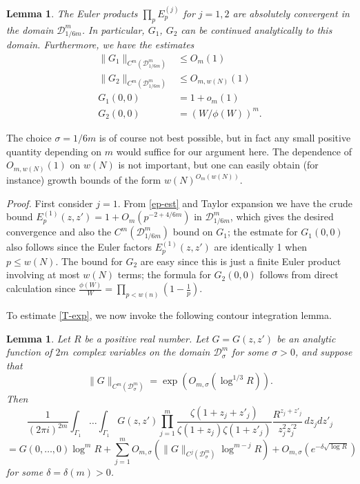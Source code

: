 \documentclass[12pt,a4paper,reqno]{amsart}
\numberwithin{equation}{section}
\theoremstyle{plain}
\newtheorem{lemma}[subsection]{Lemma}
\theoremstyle{definition}
\renewcommand{\leq}{\leqslant}
\def\D{{\mathcal D}}
\def\w{w}
\def\vs{\vspace{11pt}}
\def\ni{\noindent}
\def\proof{\noindent\textit{Proof. }}
\def\endproof{\hfill{\usebox{\proofbox}}}
\def\emph#1{{\it #1}}
\begin{document}
\begin{lemma}\label{midnight}  The Euler products $\prod_p E_p^{(j)}$ for $j=1,2$ are absolutely convergent in the domain
$\D^m_{1/6m}$.  In particular, $G_1$, $G_2$ can be continued analytically to this 
domain.  Furthermore, we have the estimates
\begin{align*}
\| G_1 \|_{C^m(\D^m_{1/6m})} &\leq O_m(1) \\
\| G_2 \|_{C^m(\D^m_{1/6m})} &\leq O_{m,\w(N)}(1) \\
G_1(0,0) &= 1 + o_m(1) \\
G_2(0,0) &= (W/\phi(W))^m.
\end{align*}
\end{lemma}

\ni\emph{Remark.} The choice $\sigma = 1/6m$ is of course not best possible, but in fact any small positive quantity depending on $m$ would suffice for our argument here.  The dependence of $O_{m,\w(N)}(1)$ on $\w(N)$ is not important, but one can easily obtain (for instance) growth bounds of the form $\w(N)^{O_m(\w(N))}$.\vs

\ni\proof First consider $j=1$.  From \eqref{ep-est} and Taylor expansion
 we have the crude bound $E_p^{(1)}(z,z') = 1 + O_m(p^{-2+4/6m})$ in $\D^m_{1/6m}$, which gives the desired
convergence and also the $C^m(\D^m_{1/6m})$ bound on $G_1$; the estmate for $G_1(0,0)$ also follows since
the Euler factors $E_p^{(1)}(z,z')$ are identically 1 when $p \leq \w(N)$.  The bound for $G_2$ are easy since
this is just a finite Euler product involving at most $\w(N)$ terms; the formula for $G_2(0,0)$ follows
from direct calculation since $\frac{\phi(W)}{W} = \prod_{p < \w(n)} (1 - \frac{1}{p})$.
\endproof \vs

\ni To estimate \eqref{T-exp}, we now invoke the following contour integration lemma.


\begin{lemma}\label{zeta-bound}\cite{goldston-yildirim}
Let $R$ be a positive real number. Let $G = G(z,z')$ be an analytic function of $2m$ complex variables on the domain $\D^m_\sigma$ for some $\sigma > 0$, and suppose that 
\begin{equation}\label{der-bound}\|G\|_{C^m(\D^m_\sigma)} = \exp(O_{m,\sigma}(\log^{1/3} R)).\end{equation}
 Then
\[ \frac{1}{(2\pi i)^{2m}}\int_{\Gamma_1} \dots \int_{\Gamma_1} G(z,z')\prod_{j=1}^m \frac{\zeta(1+z_j + z'_j)}{\zeta(1 + z_j)\zeta(1 + z'_j)} \frac{R^{z_j + z'_j}}{z_j^2z^{\prime 2}_j} \, dz_jdz'_j  \]
\[ = G(0,\dots,0) \log^m R + \sum_{j=1}^m O_{m,\sigma}(\| G \|_{C^j(\D^m_\sigma)} \log^{m-j} R) + O_{m,\sigma}(e^{-\delta \sqrt{\log R}})\]
for some $\delta = \delta(m) > 0$. 
\end{lemma}
\end{document}
